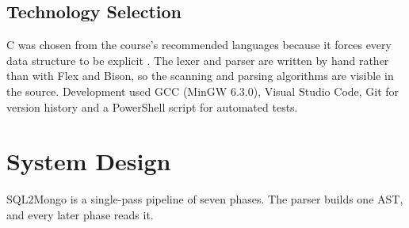\documentclass[12pt,a4paper]{report}
\begin{document}
\section{Technology Selection}
C was chosen from the course's recommended languages because it forces every data structure to be explicit \cite{kr}. The lexer and parser are written by hand rather than with Flex and Bison, so the scanning and parsing algorithms are visible in the source. Development used GCC (MinGW 6.3.0), Visual Studio Code, Git for version history and a PowerShell script for automated tests.

\chapter{System Design}
SQL2Mongo is a single-pass pipeline of seven phases. The parser builds one AST, and every later phase reads it.
\end{document}
